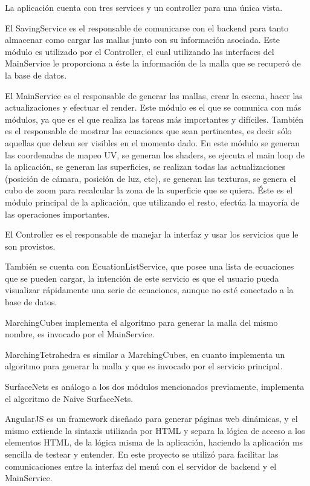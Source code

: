\documentclass[12pt]{article}
\begin{document}
La aplicación cuenta con tres services y un controller para una única vista. 

El SavingService es el responsable de comunicarse con el backend para tanto almacenar como cargar las mallas junto con su información asociada. Este módulo es utilizado por el Controller, el cual utilizando las interfaces del MainService le proporciona a éste la información de la malla que se recuperó de la base de datos.

El MainService es el responsable de generar las mallas, crear la escena, hacer las actualizaciones y efectuar el render. Este módulo es el que se comunica con más módulos, ya que es el que realiza las tareas más importantes y difíciles. También es el responsable de mostrar las ecuaciones que sean pertinentes, es decir sólo aquellas que deban ser visibles en el momento dado. En este módulo se generan las coordenadas de mapeo UV, se generan los shaders, se ejecuta el main loop de la aplicación, se generan las superficies, se realizan todas las actualizaciones (posición de cámara, posición de luz, etc), se generan las texturas, se genera el cubo de zoom para recalcular la zona de la superficie que se quiera. Éste es el módulo principal de la aplicación, que utilizando el resto, efectúa la mayoría de las operaciones importantes.

El Controller es el responsable de manejar la interfaz y usar los servicios que le son provistos.

También se cuenta con EcuationListService, que posee una lista de ecuaciones que se pueden cargar, la intención de este servicio es que el usuario pueda visualizar rápidamente una serie de ecuaciones, aunque no esté conectado a la base de datos.

MarchingCubes implementa el algoritmo para generar la malla del mismo nombre, es invocado por el MainService.

MarchingTetrahedra es similar a MarchingCubes, en cuanto implementa un algoritmo para generar la malla y que es invocado por el servicio principal.

SurfaceNets es análogo a los dos módulos mencionados previamente, implementa el algoritmo de Naive SurfaceNets.

AngularJS es un framework diseñado para generar páginas web dinámicas, y el mismo extiende la sintaxis utilizada por HTML y separa la lógica de acceso a los elementos HTML, de la lógica misma de la aplicación, haciendo la aplicación ms sencilla de testear y entender. En este proyecto se utilizó para facilitar las comunicaciones entre la interfaz del menú con el servidor de backend y el MainService.
\end{document}

